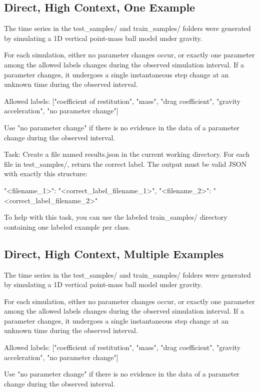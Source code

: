 \documentclass[11pt]{article}
\begin{document}
\subsection*{Direct, High Context, One Example}
\begin{DocCode}
The time series in the test_samples/ and train_samples/ folders were generated by simulating a 1D vertical point-mass ball model under gravity.

For each simulation, either no parameter changes occur, or exactly one parameter among the allowed labels changes during the observed simulation interval.
If a parameter changes, it undergoes a single instantaneous step change at an unknown time during the observed interval.

Allowed labels:
["coefficient of restitution", "mass", "drag coefficient", "gravity acceleration", "no parameter change"]

Use "no parameter change" if there is no evidence in the data of a parameter change during the observed interval.

Task:
Create a file named results.json in the current working directory.
For each file in test_samples/, return the correct label.
The output must be valid JSON with exactly this structure:
{

  "<filename_1>": "<correct_label_filename_1>",
  "<filename_2>": "<correct_label_filename_2>"

}

To help with this task, you can use the labeled train_samples/ directory containing one labeled example per class. 

\subsection*{Direct, High Context, Multiple Examples}
\begin{DocCode}
The time series in the test_samples/ and train_samples/ folders were generated by simulating a 1D vertical point-mass ball model under gravity.

For each simulation, either no parameter changes occur, or exactly one parameter among the allowed labels changes during the observed simulation interval.
If a parameter changes, it undergoes a single instantaneous step change at an unknown time during the observed interval.

Allowed labels:
["coefficient of restitution", "mass", "drag coefficient", "gravity acceleration", "no parameter change"]

Use "no parameter change" if there is no evidence in the data of a parameter change during the observed interval.


\end{DocCode}
\end{DocCode}
\end{document}
